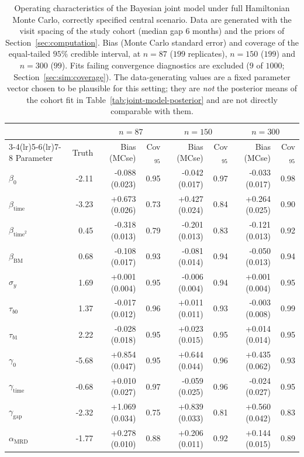\begin{table}[!htbp]
\centering
\caption{Operating characteristics of the Bayesian joint model under full Hamiltonian Monte Carlo, correctly specified central scenario. Data are generated with the visit spacing of the study cohort (median gap $6$ months) and the priors of Section~\ref{sec:computation}. Bias (Monte Carlo standard error) and coverage of the equal-tailed $95\%$ credible interval, at $n=87$ ($199$ replicates), $n=150$ ($199$) and $n=300$ ($99$). Fits failing convergence diagnostics are excluded ($9$ of $1000$; Section~\ref{sec:sim:coverage}). The data-generating values are a fixed parameter vector chosen to be plausible for this setting; they are \emph{not} the posterior means of the cohort fit in Table~\ref{tab:joint-model-posterior} and are not directly comparable with them.}
\label{tab:sim-coverage}
\small
\begin{tabular}{lrrrrrrr}
\toprule
 & & \multicolumn{2}{c}{$n=87$} & \multicolumn{2}{c}{$n=150$} & \multicolumn{2}{c}{$n=300$}\\
\cmidrule(lr){3-4}\cmidrule(lr){5-6}\cmidrule(lr){7-8}
Parameter & Truth & Bias (MCse) & Cov$_{95}$ & Bias (MCse) & Cov$_{95}$ & Bias (MCse) & Cov$_{95}$\\
\midrule
$\beta_0$ & -2.11 & -0.088 (0.023) & 0.95 & -0.042 (0.017) & 0.97 & -0.033 (0.017) & 0.98\\
$\beta_{\mathrm{time}}$ & -3.23 & +0.673 (0.026) & 0.73 & +0.427 (0.024) & 0.84 & +0.264 (0.025) & 0.90\\
$\beta_{\mathrm{time}^2}$ & 0.45 & -0.318 (0.013) & 0.79 & -0.201 (0.013) & 0.83 & -0.121 (0.013) & 0.92\\
$\beta_{\mathrm{BM}}$ & 0.68 & -0.108 (0.017) & 0.93 & -0.081 (0.014) & 0.94 & -0.050 (0.013) & 0.94\\
$\sigma_y$ & 1.69 & +0.001 (0.004) & 0.95 & -0.006 (0.004) & 0.94 & +0.001 (0.004) & 0.95\\
$\tau_{b0}$ & 1.37 & -0.017 (0.012) & 0.96 & +0.011 (0.011) & 0.93 & -0.003 (0.008) & 0.99\\
$\tau_{b1}$ & 2.22 & -0.028 (0.018) & 0.95 & +0.023 (0.015) & 0.95 & +0.014 (0.014) & 0.95\\
$\gamma_0$ & -5.68 & +0.854 (0.047) & 0.95 & +0.644 (0.044) & 0.96 & +0.435 (0.062) & 0.93\\
$\gamma_{\mathrm{time}}$ & -0.68 & +0.010 (0.027) & 0.97 & -0.059 (0.025) & 0.96 & -0.024 (0.027) & 0.95\\
$\gamma_{\mathrm{gap}}$ & -2.32 & +1.069 (0.034) & 0.75 & +0.839 (0.033) & 0.81 & +0.560 (0.042) & 0.83\\
$\alpha_{\mathrm{MRD}}$ & -1.77 & +0.278 (0.010) & 0.88 & +0.206 (0.011) & 0.92 & +0.144 (0.015) & 0.89\\
\bottomrule
\end{tabular}
\end{table}
